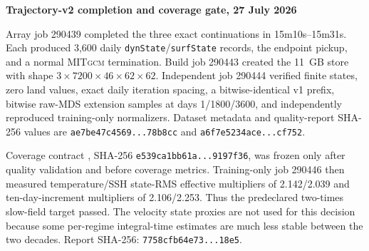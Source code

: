 \documentclass[11pt]{article}
\newcommand{\MITgcm}{\textsc{MITgcm}}
\newenvironment{examplebox}[1]
  {\begin{center}\begin{lrbox}{\examplestore}\begin{minipage}{0.92\textwidth}%
   \textbf{#1}\par\smallskip}
  {\end{minipage}\end{lrbox}\setlength{\fboxsep}{8pt}%
   \fcolorbox{blue}{lightblue}{\usebox{\examplestore}}\end{center}}
\begin{document}
\begin{examplebox}{Trajectory-v2 completion and coverage gate, 27 July 2026}
Array job 290439 completed the three exact continuations in 15m10s--15m31s.  Each
produced 3,600 daily \texttt{dynState}/\texttt{surfState} records, the endpoint pickup,
and a normal \MITgcm{} termination.  Build job 290443 created the 11~GB
 store with shape
\(3\times7200\times46\times62\times62\).  Independent job 290444 verified finite
states, zero land values, exact daily iteration spacing, a bitwise-identical v1 prefix,
bitwise raw-MDS extension samples at days 1/1800/3600, and independently reproduced
training-only normalizers.  Dataset metadata and quality-report SHA-256 values are
\texttt{ae7be47c4569...78b8cc} and \texttt{a6f7e5234ace...cf752}.

Coverage contract , SHA-256
\texttt{e539ca1bb61a...9197f36}, was frozen only after quality validation and before
coverage metrics.  Training-only job 290446 then measured temperature/SSH state-RMS
effective multipliers of 2.142/2.039 and ten-day-increment multipliers of 2.106/2.253.
Thus the predeclared two-times slow-field target passed.  The velocity state proxies are
not used for this decision because some per-regime integral-time estimates are much
less stable between the two decades.  Report SHA-256:
\texttt{7758cfb64e73...18e5}.
\end{examplebox}
\end{document}
